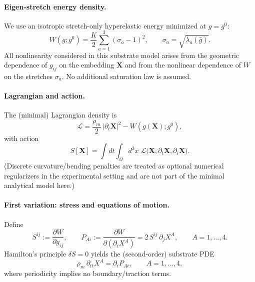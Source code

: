 \paragraph{Eigen-stretch energy density.}
We use an isotropic stretch-only hyperelastic energy minimized at $g=g^0$:
\begin{equation}
  W(g;g^0)=\frac{K}{2}\sum_{a=1}^3(\sigma_a-1)^2,
  \qquad \sigma_a=\sqrt{\lambda_a(\widehat g)}.
  \label{eq:eigen-stretch-energy}
\end{equation}
All nonlinearity considered in this substrate model arises from the geometric
dependence of $g_{ij}$ on the embedding $\mathbf X$ and from the nonlinear
dependence of $W$ on the stretches $\sigma_a$. No additional saturation law is assumed.

\paragraph{Lagrangian and action.}
The (minimal) Lagrangian density is
\begin{equation}
  \mathcal L
  =\frac{\rho_m}{2}\,|\partial_t\mathbf X|^2
  -W(g(\mathbf X);g^0),
  \label{eq:brane-lagrangian}
\end{equation}
with action
\begin{equation}
  S[\mathbf X]=\int dt\int_{\Omega} d^3x\;\mathcal L\big(\mathbf X,\partial_t\mathbf X,\partial_i\mathbf X\big).
  \label{eq:brane-action}
\end{equation}
(Discrete curvature/bending penalties are treated as optional numerical regularizers
in the experimental setting and are not part of the minimal analytical model here.)

\paragraph{First variation: stress and equations of motion.}
Define
\begin{equation}
  S^{ij}:=\frac{\partial W}{\partial g_{ij}},
  \qquad
  P_{Ai}:=\frac{\partial W}{\partial(\partial_i X^A)} = 2\,S^{ij}\,\partial_j X^A,
  \qquad A=1,\dots,4.
  \label{eq:piola-stress}
\end{equation}
Hamilton's principle $\delta S=0$ yields the (second-order) substrate PDE
\begin{equation}
  \rho_m\,\partial_{tt}X^A = \partial_i P_{Ai},
  \qquad A=1,\dots,4,
  \label{eq:equations-of-motion}
\end{equation}
where periodicity implies no boundary/traction terms.

